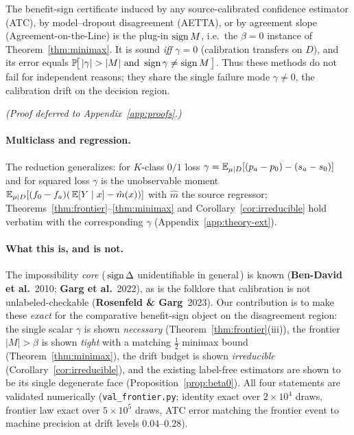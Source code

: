 \begin{proposition}[The heuristics are the $\beta{=}0$ face]\label{prop:beta0}
The benefit-sign certificate induced by any source-calibrated confidence estimator (ATC),
by model--dropout disagreement (AETTA), or by agreement slope (Agreement-on-the-Line) is
the plug-in $\operatorname{sign} M$, i.e.\ the $\beta{=}0$ instance of Theorem~\ref{thm:minimax}. It is
sound \emph{iff} $\gamma=0$ (calibration transfers on $D$), and its error equals
$\Pr\!\big[\,|\gamma|>|M|\ \text{and}\ \sign\gamma\neq\sign M\,\big]$. Thus these methods do
not fail for independent reasons; they share the single failure mode $\gamma\neq0$, the
calibration drift on the decision region.
\end{proposition}
\emph{(Proof deferred to Appendix~\ref{app:proofs}.)}

\paragraph{Multiclass and regression.} The reduction generalizes: for $K$-class $0/1$ loss
$\gamma=\mathbb{E}_{\mu\mid D}[(p_a-p_0)-(s_a-s_0)]$ and for squared loss $\gamma$ is the
unobservable moment $\mathbb{E}_{\mu\mid D}[(f_0-f_a)(\,\mathbb{E}[Y\mid x]-\hat m(x))]$ with $\hat m$ the
source regressor; Theorems~\ref{thm:frontier}--\ref{thm:minimax} and
Corollary~\ref{cor:irreducible} hold verbatim with the corresponding $\gamma$
(Appendix~\ref{app:theory-ext}).

\paragraph{What this is, and is not.} The impossibility \emph{core}
(\,$\operatorname{sign}\Delta$ unidentifiable in general\,) is known
(\textbf{Ben-David et al.}\ 2010; \textbf{Garg et al.}\ 2022), as is the folklore that
calibration is not unlabeled-checkable (\textbf{Rosenfeld \& Garg}\ 2023). Our contribution is to make these
\emph{exact} for the comparative benefit-sign object on the disagreement region: the single
scalar $\gamma$ is shown \emph{necessary} (Theorem~\ref{thm:frontier}(iii)), the frontier
$|M|>\beta$ is shown \emph{tight} with a matching $\tfrac12$ minimax bound
(Theorem~\ref{thm:minimax}), the drift budget is shown \emph{irreducible}
(Corollary~\ref{cor:irreducible}), and the existing label-free estimators are shown to be
its single degenerate face (Proposition~\ref{prop:beta0}). All four statements are validated
numerically (\texttt{val\_frontier.py}; identity exact over $2{\times}10^4$ draws, frontier
law exact over $5{\times}10^5$ draws, ATC error matching the frontier event to machine
precision at drift levels $0.04$--$0.28$).
